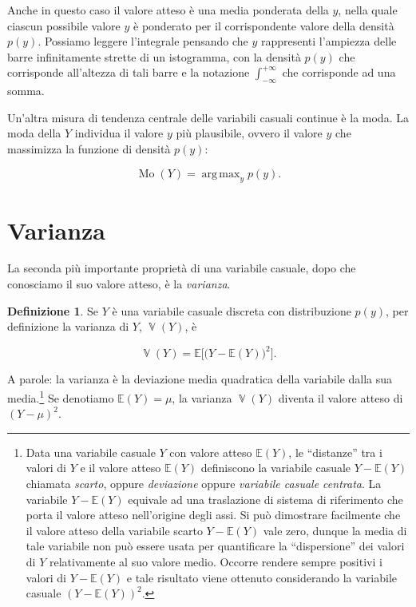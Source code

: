 \documentclass[
  11pt,
]{krantz}
\DeclareMathOperator{\Var}{\mathbb{V}} %
\DeclareMathOperator{\Mo}{Mo} %
\DeclareMathOperator{\argmax}{arg\,max}
\newcommand{\E}{\mathbb{E}} %
\theoremstyle{definition}
\newtheorem{definition}{Definizione}[chapter]
\theoremstyle{definition}
\theoremstyle{definition}
\theoremstyle{definition}
\theoremstyle{remark}
\begin{document}
Anche in questo caso il valore atteso è una media ponderata della \(y\), nella quale ciascun possibile valore \(y\) è ponderato per il corrispondente valore della densità \(p(y)\). Possiamo leggere l'integrale pensando che \(y\) rappresenti l'ampiezza delle barre infinitamente strette di un istogramma, con la densità \(p(y)\) che corrisponde all'altezza di tali barre e la notazione \(\int_{-\infty}^{+\infty}\) che corrisponde ad una somma.

Un'altra misura di tendenza centrale delle variabili casuali continue è la moda. La moda della \(Y\) individua il valore \(y\) più plausibile, ovvero il valore \(y\) che massimizza la funzione di densità \(p(y)\):

\begin{equation}
\Mo(Y) = \argmax_y p(y).
\label{eq:def-mode}
\end{equation}

\hypertarget{varianza}{%
\section{Varianza}\label{varianza}}

La seconda più importante proprietà di una variabile casuale, dopo che conosciamo il suo valore atteso, è la \emph{varianza}.

\begin{definition}
Se \(Y\) è una variabile casuale discreta con distribuzione \(p(y)\), per definizione la varianza di \(Y\), \(\Var(Y)\), è

\begin{equation}
\Var(Y) = \E\Big[\big(Y - \E(Y)\big)^2\Big].
\label{eq:def-var-rv}
\end{equation}
\end{definition}

A parole: la varianza è la deviazione media quadratica della variabile dalla sua media.\footnote{Data una variabile casuale \(Y\) con valore atteso \(\E(Y)\), le ``distanze'' tra i valori di \(Y\) e il valore atteso \(\E(Y)\) definiscono la variabile casuale \(Y - \E(Y)\) chiamata \emph{scarto}, oppure \emph{deviazione} oppure \emph{variabile casuale centrata}. La variabile \(Y - \E(Y)\) equivale ad una traslazione di sistema di riferimento che porta il valore atteso nell'origine degli assi. Si può dimostrare facilmente che il valore atteso della variabile scarto \(Y - \E(Y)\) vale zero, dunque la media di tale variabile non può essere usata per quantificare la ``dispersione'' dei valori di \(Y\) relativamente al suo valore medio. Occorre rendere sempre positivi i valori di \(Y - \E(Y)\) e tale risultato viene ottenuto considerando la variabile casuale \(\left(Y - \E(Y)\right)^2\).} Se denotiamo \(\E(Y) = \mu\), la varianza \(\Var(Y)\) diventa il valore atteso di \((Y - \mu)^2\).
\end{document}

